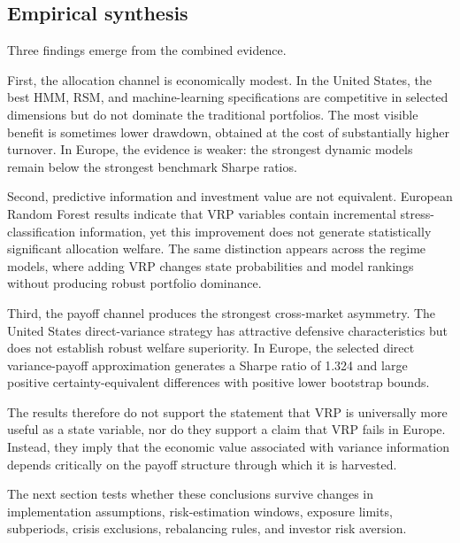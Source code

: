 \subsection{Empirical synthesis}

Three findings emerge from the combined evidence.

First, the allocation channel is economically modest. In the United States, the best HMM, RSM, and machine-learning specifications are competitive in selected dimensions but do not dominate the traditional portfolios. The most visible benefit is sometimes lower drawdown, obtained at the cost of substantially higher turnover. In Europe, the evidence is weaker: the strongest dynamic models remain below the strongest benchmark Sharpe ratios.

Second, predictive information and investment value are not equivalent. European Random Forest results indicate that VRP variables contain incremental stress-classification information, yet this improvement does not generate statistically significant allocation welfare. The same distinction appears across the regime models, where adding VRP changes state probabilities and model rankings without producing robust portfolio dominance.

Third, the payoff channel produces the strongest cross-market asymmetry. The United States direct-variance strategy has attractive defensive characteristics but does not establish robust welfare superiority. In Europe, the selected direct variance-payoff approximation generates a Sharpe ratio of 1.324 and large positive certainty-equivalent differences with positive lower bootstrap bounds.

The results therefore do not support the statement that VRP is universally more useful as a state variable, nor do they support a claim that VRP fails in Europe. Instead, they imply that the economic value associated with variance information depends critically on the payoff structure through which it is harvested.

The next section tests whether these conclusions survive changes in implementation assumptions, risk-estimation windows, exposure limits, subperiods, crisis exclusions, rebalancing rules, and investor risk aversion.
